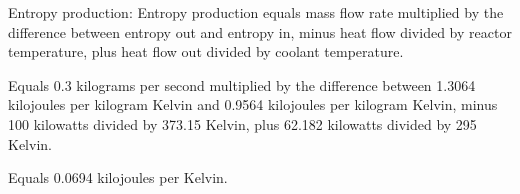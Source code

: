 Entropy production:  
Entropy production equals mass flow rate multiplied by the difference between entropy out and entropy in, minus heat flow divided by reactor temperature, plus heat flow out divided by coolant temperature.  

Equals 0.3 kilograms per second multiplied by the difference between 1.3064 kilojoules per kilogram Kelvin and 0.9564 kilojoules per kilogram Kelvin, minus 100 kilowatts divided by 373.15 Kelvin, plus 62.182 kilowatts divided by 295 Kelvin.  

Equals 0.0694 kilojoules per Kelvin.